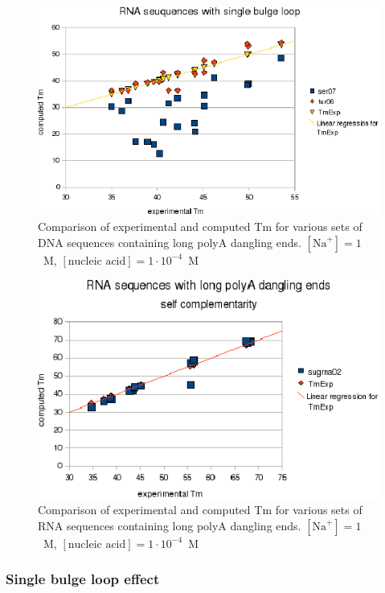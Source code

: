 \documentclass{article}
\begin{document}
\begin{figure}[h]
\includegraphics[width=1\linewidth]{images/DNALongDanglingEnd}
\caption{Comparison of experimental and computed Tm for various sets of DNA sequences containing long polyA dangling ends. $[\mbox{Na}^+] = 1$~M, $[\mbox{nucleic acid}] = 1\cdot{}10^{-4}$~M}
\end{figure}

\begin{figure}[h]
\includegraphics[width=1\linewidth]{images/RNALongDanglingEnd}
\caption{Comparison of experimental and computed Tm for various sets of RNA sequences containing long polyA dangling ends. $[\mbox{Na}^+] = 1$~M, $[\mbox{nucleic acid}] = 1\cdot{}10^{-4}$~M}
\end{figure}

\clearpage
\subsubsection{Single bulge loop effect}
\end{document}
